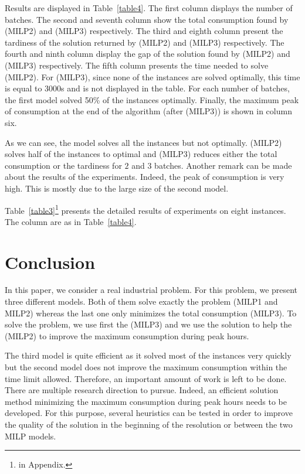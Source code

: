 Results are displayed in Table~\ref{table4}. The first column 
displays the number of batches. The second and seventh column show the
total consumption found by (MILP2) and (MILP3) respectively. The third
and eighth column present the tardiness of the solution returned by
(MILP2) and (MILP3) respectively. The fourth and ninth column display
the gap of the solution found by (MILP2) and (MILP3)
respectively. The fifth column presents the time needed to solve
(MILP2). For (MILP3), since none of the instances are solved
optimally, this time is equal to 3000s and is not displayed in the
table. For each number of batches, the first model solved 50\% of the
instances optimally. Finally, the maximum peak of consumption at the end of the
algorithm (after (MILP3)) is shown in column six.


As we can see, the model solves all the instances but not
optimally. (MILP2) solves half of the instances to optimal and (MILP3)
reduces either the total consumption or the tardiness for $2$ and $3$
batches. Another remark can be made about the results of the
experiments. Indeed, the peak of consumption is very high. This
is mostly due to the large size of the second model.

Table~\ref{table3}\footnote{in Appendix.} presents the detailed
results of experiments on eight instances. The column are as in
Table~\ref{table4}.
 
\section{Conclusion}
\label{sec:concl}

In this paper, we consider a real industrial problem. For this
problem, we present three different models. Both of them solve exactly
the problem (MILP1 and MILP2) whereas the last one only minimizes the
total consumption (MILP3). To solve the problem, we use first the
(MILP3) and we use the solution to help the (MILP2) to improve the
maximum consumption during peak hours.

The third model is quite efficient as it solved most of the instances very quickly but the second model does not improve the maximum consumption within
the time limit allowed. Therefore, an important amount of work is left
to be done. There are multiple research direction to pursue. Indeed,
an efficient solution method minimizing the maximum consumption during
peak hours needs to be developed. For this purpose, several heuristics
can be tested in order to improve the quality of the solution in the
beginning of the resolution or between the two MILP models.

